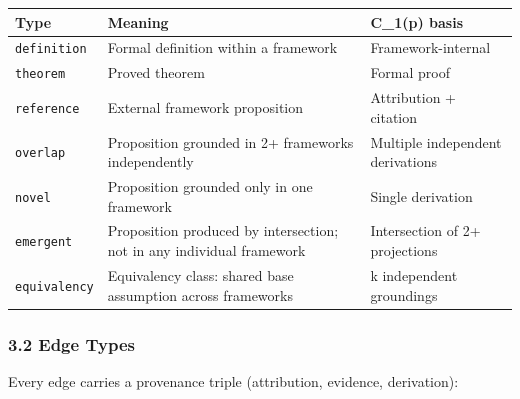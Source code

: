 \documentclass[
]{article}
\newcounter{none} %
\begin{document}
{\def\LTcaptype{none} %
\begin{longtable}[]{@{}
  >{\raggedright\arraybackslash}p{}
  >{\raggedright\arraybackslash}p{}
  >{\raggedright\arraybackslash}p{}@{}}
\toprule\noalign{}
\begin{minipage}[b]{\linewidth}\raggedright
Type
\end{minipage} & \begin{minipage}[b]{\linewidth}\raggedright
Meaning
\end{minipage} & \begin{minipage}[b]{\linewidth}\raggedright
C\_1(p) basis
\end{minipage} \\
\midrule\noalign{}
\endhead
\bottomrule\noalign{}
\endlastfoot
\texttt{definition} & Formal definition within a framework &
Framework-internal \\
\texttt{theorem} & Proved theorem & Formal proof \\
\texttt{reference} & External framework proposition & Attribution +
citation \\
\texttt{overlap} & Proposition grounded in 2+ frameworks independently &
Multiple independent derivations \\
\texttt{novel} & Proposition grounded only in one framework & Single
derivation \\
\texttt{emergent} & Proposition produced by intersection; not in any
individual framework & Intersection of 2+ projections \\
\texttt{equivalency} & Equivalency class: shared base assumption across
frameworks & k independent groundings \\
\end{longtable}
}

\subsubsection{3.2 Edge Types}\label{edge-types}

Every edge carries a provenance triple (attribution, evidence,
derivation):
\end{document}
